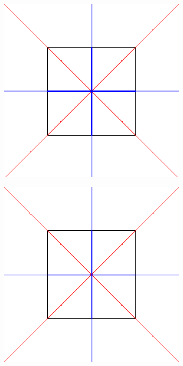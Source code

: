 \documentclass[11pt]{article}
\begin{document}
\begin{figure}[H]
\begin{subfigure}[b]{0.18\textwidth}
     \caption{}
     \label{fig:s21}
  \end{subfigure}
    \begin{subfigure}[b]{0.18\textwidth}
    \includegraphics[width=\textwidth]{FIGS/Part4/s22}
     \caption{}
     \label{fig:s22}
  \end{subfigure}
      \begin{subfigure}[b]{0.18\textwidth}
    \includegraphics[width=\textwidth]{FIGS/Part4/s23}

\end{subfigure}
\end{figure}
\end{document}
